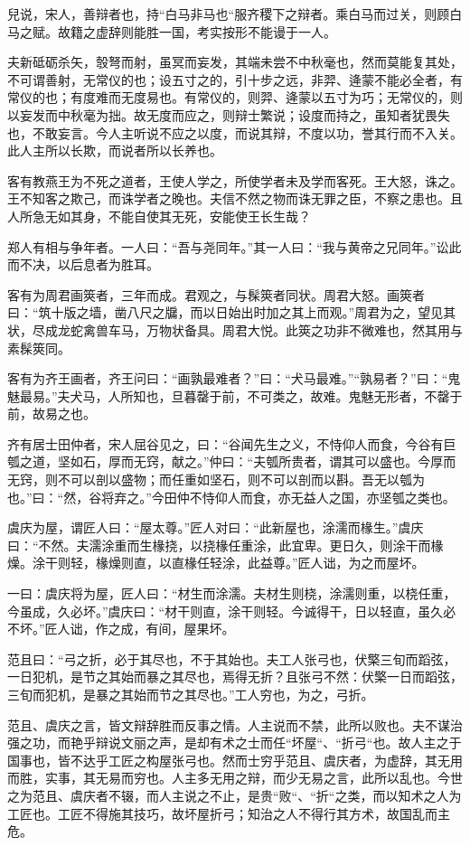 \documentclass[]{article}
\begin{document}
兒说，宋人，善辩者也，持``白马非马也``服齐稷下之辩者。乘白马而过关，则顾白马之赋。故籍之虚辞则能胜一国，考实按形不能谩于一人。

夫新砥砺杀矢，彀弩而射，虽冥而妄发，其端未尝不中秋毫也，然而莫能复其处，不可谓善射，无常仪的也；设五寸之的，引十步之远，非羿、逄蒙不能必全者，有常仪的也；有度难而无度易也。有常仪的，则羿、逄蒙以五寸为巧；无常仪的，则以妄发而中秋毫为拙。故无度而应之，则辩士繁说；设度而持之，虽知者犹畏失也，不敢妄言。今人主听说不应之以度，而说其辩，不度以功，誉其行而不入关。此人主所以长欺，而说者所以长养也。

客有教燕王为不死之道者，王使人学之，所使学者未及学而客死。王大怒，诛之。王不知客之欺己，而诛学者之晚也。夫信不然之物而诛无罪之臣，不察之患也。且人所急无如其身，不能自使其无死，安能使王长生哉？

郑人有相与争年者。一人曰：``吾与尧同年。''其一人曰：``我与黄帝之兄同年。''讼此而不决，以后息者为胜耳。

客有为周君画筴者，三年而成。君观之，与髹筴者同状。周君大怒。画筴者曰：``筑十版之墙，凿八尺之牖，而以日始出时加之其上而观。''周君为之，望见其状，尽成龙蛇禽兽车马，万物状备具。周君大悦。此筴之功非不微难也，然其用与素髹筴同。

客有为齐王画者，齐王问曰：``画孰最难者？''曰：``犬马最难。''``孰易者？''曰：``鬼魅最易。''夫犬马，人所知也，旦暮罄于前，不可类之，故难。鬼魅无形者，不罄于前，故易之也。

齐有居士田仲者，宋人屈谷见之，曰：``谷闻先生之义，不恃仰人而食，今谷有巨瓠之道，坚如石，厚而无窍，献之。''仲曰：``夫瓠所贵者，谓其可以盛也。今厚而无窍，则不可以剖以盛物；而任重如坚石，则不可以剖而以斟。吾无以瓠为也。''曰：``然，谷将弃之。''今田仲不恃仰人而食，亦无益人之国，亦坚瓠之类也。

虞庆为屋，谓匠人曰：``屋太尊。''匠人对曰：``此新屋也，涂濡而椽生。''虞庆曰：``不然。夫濡涂重而生椽挠，以挠椽任重涂，此宜卑。更日久，则涂干而椽燥。涂干则轻，椽燥则直，以直椽任轻涂，此益尊。''匠人诎，为之而屋坏。

一曰：虞庆将为屋，匠人曰：``材生而涂濡。夫材生则桡，涂濡则重，以桡任重，今虽成，久必坏。''虞庆曰：``材干则直，涂干则轻。今诚得干，日以轻直，虽久必不坏。''匠人诎，作之成，有间，屋果坏。

范且曰：``弓之折，必于其尽也，不于其始也。夫工人张弓也，伏檠三旬而蹈弦，一日犯机，是节之其始而暴之其尽也，焉得无折？且张弓不然：伏檠一日而蹈弦，三旬而犯机，是暴之其始而节之其尽也。''工人穷也，为之，弓折。

范且、虞庆之言，皆文辩辞胜而反事之情。人主说而不禁，此所以败也。夫不谋治强之功，而艳乎辩说文丽之声，是却有术之士而任``坏屋``、``折弓``也。故人主之于国事也，皆不达乎工匠之构屋张弓也。然而士穷乎范且、虞庆者，为虚辞，其无用而胜，实事，其无易而穷也。人主多无用之辩，而少无易之言，此所以乱也。今世之为范且、虞庆者不辍，而人主说之不止，是贵``败``、``折``之类，而以知术之人为工匠也。工匠不得施其技巧，故坏屋折弓；知治之人不得行其方术，故国乱而主危。
\end{document}
